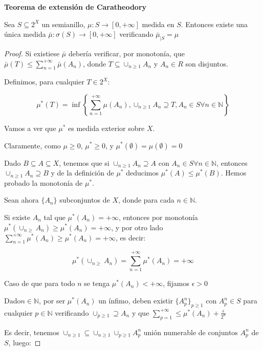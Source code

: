 \begin{theorem} \textbf{Teorema de extensión de Caratheodory}

 Sea $S \subseteq 2^X$ un semianillo, $\mu:S \rightarrow [0,+\infty]$ medida en $S$. Entonces existe
 una única medida $\bar{\mu}:\sigma(S) \rightarrow [0,+\infty]$ verificando $\bar{\mu}_{|S} = \mu$
\end{theorem}

\begin{proof}
 Si existiese $\bar{\mu}$ debería verificar, por monotonía, que $\bar{\mu}(T) \le \sum_{n=1}^{+\infty} \bar{\mu}(A_n)$, 
 donde $T \subseteq \cup_{n\ge 1} A_n$ y $A_n\in R$ son disjuntos.
 
 Definimos, para cualquier $T\in 2^X$:
 
 \[\mu^\ast(T) = \inf\left\{\sum_{n=1}^{+\infty} \mu(A_n), \cup_{n\ge 1} A_n \supseteq T,
                 A_n\in S \forall n\in\mathbb{N}\right\}\]
                 
 Vamos a ver que $\mu^\ast$ es medida exterior sobre $X$.
 
 Claramente, como $\mu \ge 0$, $\mu^\ast \ge 0$, y $\mu^\ast(\emptyset) = \mu(\emptyset) = 0$
 
 Dado $B\subseteq A \subseteq X$, tenemos que si $\cup_{n\ge 1} A_n \supseteq A$ con $A_n\in S \forall n\in\mathbb{N}$,
 entonces $\cup_{n\ge 1} A_n \supseteq B$ y de la definición de $\mu^\ast$ deducimos $\mu^\ast(A) \le \mu^\ast(B)$.
 Hemos probado la monotonía de $\mu^\ast$.
 
 Sean ahora $\{A_n\}$ subconjuntos de $X$, donde para cada $n\in \mathbb{N}$.
 
 Si existe $A_n$ tal que $\mu^\ast(A_n) = +\infty$, entonces por monotonía 
 $\mu^\ast(\cup_{n\ge} A_n) \ge \mu^\ast(A_n) = +\infty$, y por otro lado 
 $\sum_{n=1}^{+\infty} \mu^\ast(A_n) \ge \mu^\ast(A_n) = +\infty$, es decir:

 \[\mu^\ast(\cup_{n\ge} A_n) = \sum_{n=1}^{+\infty} \mu^\ast(A_n) = +\infty\]
 
 Caso de que para todo $n$ se tenga $\mu^\ast(A_n) < +\infty$, fijamos $\epsilon > 0$
 
 Dado$n\in \mathbb{N}$, por ser $\mu^\ast(A_n)$ un ínfimo, deben existir $\{A_p^n\}_{p\ge 1}$ con 
 $A_p^n \in S$ para cualquier $p\in\mathbb{N}$ verificando $\cup_{p\ge 1} \supseteq A_n$ y que
 $\sum_{p=1}^{+\infty} \le \mu^\ast(A_n) + \frac{\epsilon}{2^n}$
 
 Es decir, tenemos $\cup_{n\ge 1} \subseteq \cup_{n\ge 1} \cup_{p\ge 1} A_p^n$ unión numerable
 de conjuntos $A_p^n$ de $S$, luego:
 

\end{proof}
